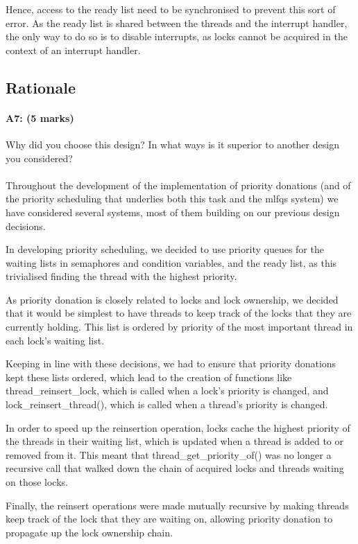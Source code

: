 Hence, access to the ready list need to be synchronised to prevent this sort of error. As the ready list is shared between the threads and the interrupt handler, the only way to do so is to disable interrupts, as locks cannot be acquired in the context of an interrupt handler.


\subsection{Rationale}
\paragraph{A7: (5 marks)}
Why did you choose this design?  In what ways is it superior to another design you considered?
\\
\\
Throughout the development of the implementation of priority donations (and of the priority scheduling that underlies both this task and the mlfqs system) we have considered several systems, most of them building on our previous design decisions.

In developing priority scheduling, we decided to use priority queues for the waiting lists in semaphores and condition variables, and the ready list, as this trivialised finding the thread with the highest priority.

As priority donation is closely related to locks and lock ownership, we decided that it would be simplest to have threads to keep track of the locks that they are currently holding. This list is ordered by priority of the most important thread in each lock's waiting list.

Keeping in line with these decisions, we had to ensure that priority donations kept these lists ordered, which lead to the creation of functions like thread_reinsert_lock, which is called when a lock's priority is changed, and lock_reinsert_thread(), which is called when a thread's priority is changed.

In order to speed up the reinsertion operation, locks cache the highest priority of the threads in their waiting list, which is updated when a thread is added to or removed from it. This meant that thread_get_priority_of() was no longer a recursive call that walked down the chain of acquired locks and threads waiting on those locks.

Finally, the reinsert operations were made mutually recursive by making threads keep track of the lock that they are waiting on, allowing priority donation to propagate up the lock ownership chain.

